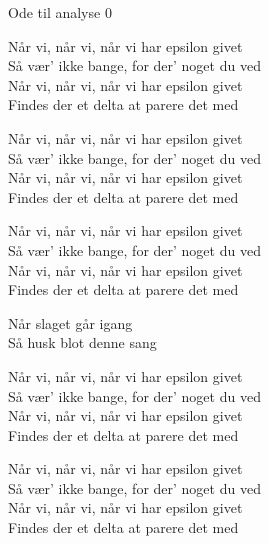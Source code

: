 \begin{song}{Ode til analyse 0}
  \begin{SBChorus}
    Når vi, når vi, når vi har epsilon givet\\
    Så vær' ikke bange, for der' noget du ved\\
    Når vi, når vi, når vi har epsilon givet\\
    Findes der et delta at parere det med
  \end{SBChorus}

  \begin{SBChorus}
    Når vi, når vi, når vi har epsilon givet\\
    Så vær' ikke bange, for der' noget du ved\\
    Når vi, når vi, når vi har epsilon givet\\
    Findes der et delta at parere det med
  \end{SBChorus}

  \begin{SBChorus}
    Når vi, når vi, når vi har epsilon givet\\
    Så vær' ikke bange, for der' noget du ved\\
    Når vi, når vi, når vi har epsilon givet\\
    Findes der et delta at parere det med
  \end{SBChorus}

  \begin{SBSection*}
    Når slaget går igang\\
    Så husk blot denne sang
  \end{SBSection*}

  \begin{SBChorus}
    Når vi, når vi, når vi har epsilon givet\\
    Så vær' ikke bange, for der' noget du ved\\
    Når vi, når vi, når vi har epsilon givet\\
    Findes der et delta at parere det med
  \end{SBChorus}

  \begin{SBChorus}
    Når vi, når vi, når vi har epsilon givet\\
    Så vær' ikke bange, for der' noget du ved\\
    Når vi, når vi, når vi har epsilon givet\\
    Findes der et delta at parere det med
  \end{SBChorus}

  \begin{SBSection*}
  \end{SBSection*}
\end{song}